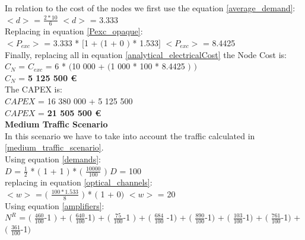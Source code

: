 In relation to the cost of the nodes we first use the equation \ref{average_demand}:\\

$<d>$ = $\frac{2 * 10}{6}$ \qquad \qquad $<d>$ = 3.333\\

Replacing in equation \ref{Pexc_opaque}:\\

$<P_{exc}>$ = 3.333 * $[$1 + $($1 + $0$ $)$ * 1.533$]$ \qquad \quad $<P_{exc}>$ = 8.4425 \\

Finally, replacing all in equation \ref{analytical_electricalCost} the Node Cost is:\\

$C_N$ = $C_{exc}$ = 6 * $($10 000 + $($1 000 * 100 * 8.4425 $)$ $)$\\

$C_N$ = \textbf{5 125 500 \euro}\\

The CAPEX is:\\
$CAPEX$ = 16 380 000 + 5 125 500\\

$CAPEX$ = \textbf{21 505 500 \euro}\\

\textbf{Medium Traffic Scenario}\\
In this scenario we have to take into account the traffic calculated in \ref{medium_traffic_scenario}.\\

Using equation \ref{demands}:\\

$D$ = $\frac{1}{2}$ * $($ 1 + 1 $)$ * $($ $\frac{10 000}{100}$ $)$ \qquad \qquad $D$ = 100\\

replacing in equation \ref{optical_channels}:\\

$<w>$ = $($ $\frac{100 * 1.533}{8}$ $)$ * $($ 1 + 0$)$ \qquad \quad $<w>$ = 20\\

Using equation \ref{amplifiers}:\\

$N^R$ = $($ $\frac{460}{100}$-1 $)$ + $($ $\frac{640}{100}$-1$)$ + $($ $\frac{75}{100}$-1 $)$ + $($ $\frac{684}{100}$ -1$)$ + $($ $\frac{890}{100}$-1$)$ + $($ $\frac{103}{100}$-1$)$ + $($ $\frac{761}{100}$-1$)$ + $($ $\frac{361}{100}$-1$)$\\

